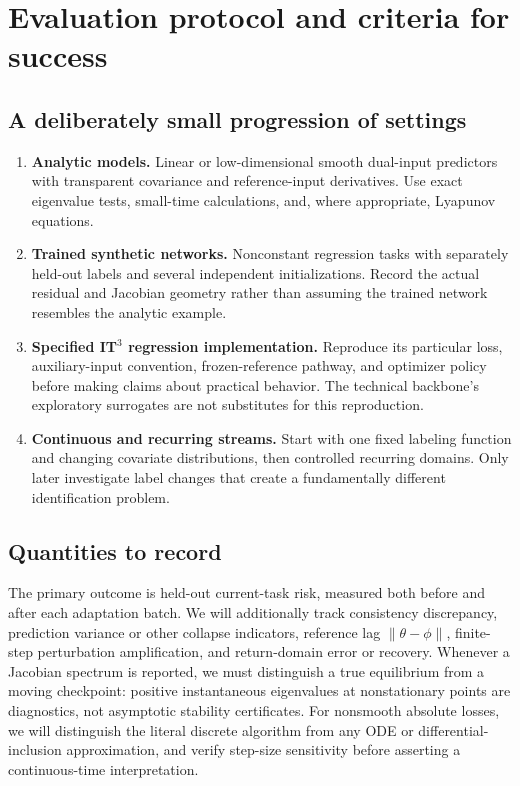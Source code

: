 \documentclass[11pt,a4paper]{article}
\newcommand{\norm}[1]{\left\lVert#1\right\rVert}
\begin{document}
\section{Evaluation protocol and criteria for success}

\subsection{A deliberately small progression of settings}
\begin{enumerate}
\item \textbf{Analytic models.} Linear or low-dimensional smooth dual-input predictors with transparent covariance and reference-input derivatives. Use exact eigenvalue tests, small-time calculations, and, where appropriate, Lyapunov equations.
\item \textbf{Trained synthetic networks.} Nonconstant regression tasks with separately held-out labels and several independent initializations. Record the actual residual and Jacobian geometry rather than assuming the trained network resembles the analytic example.
\item \textbf{Specified IT$^3$ regression implementation.} Reproduce its particular loss, auxiliary-input convention, frozen-reference pathway, and optimizer policy before making claims about practical behavior. The technical backbone's exploratory surrogates are not substitutes for this reproduction.
\item \textbf{Continuous and recurring streams.} Start with one fixed labeling function and changing covariate distributions, then controlled recurring domains. Only later investigate label changes that create a fundamentally different identification problem.
\end{enumerate}

\subsection{Quantities to record}
The primary outcome is held-out current-task risk, measured both before and after each adaptation batch. We will additionally track consistency discrepancy, prediction variance or other collapse indicators, reference lag $\norm{\theta-\phi}$, finite-step perturbation amplification, and return-domain error or recovery. Whenever a Jacobian spectrum is reported, we must distinguish a true equilibrium from a moving checkpoint: positive instantaneous eigenvalues at nonstationary points are diagnostics, not asymptotic stability certificates. For nonsmooth absolute losses, we will distinguish the literal discrete algorithm from any ODE or differential-inclusion approximation, and verify step-size sensitivity before asserting a continuous-time interpretation.
\end{document}
